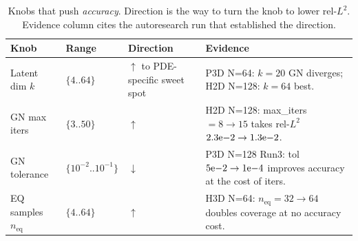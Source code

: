\documentclass{article}
\begin{document}
  \begin{table}[!htbp]                                                                                         
  \centering                                                                                               
  \caption{Knobs that push \emph{accuracy}. Direction is the way to
  turn the knob to lower rel-$L^2$. Evidence column cites the                                              
  autoresearch run that established the direction.}                                                        
  \label{tab:t2a}                                                                                          
  \small                                                                                                   
  \setlength{\tabcolsep}{4pt}                         
  \begin{tabular}{p{3.0cm}p{2.4cm}p{1.4cm}p{5.5cm}}                                                        
  \toprule                                                                                                 
  Knob & Range & Direction & Evidence \\       
  \midrule                                                                                                 
  Latent dim $k$         & $\{4..64\}$        & $\uparrow$ to PDE-specific sweet spot
    & P3D N=64: $k{=}20$ GN diverges; H2D N=128: $k{=}64$ best. \\                                         
  GN max iters           & $\{3..50\}$        & $\uparrow$                                                 
    & H2D N=128: max\_iters$=8 \to 15$ takes rel-$L^2$ $2.3{\rm e}{-2} \to 1.3{\rm e}{-2}$. \\             
  GN tolerance           & $\{10^{-2}..10^{-1}\}$ & $\downarrow$                                           
    & P3D N=128 Run3: tol $5{\rm e}{-2} \to 1{\rm e}{-4}$ improves accuracy at the cost of iters. \\       
  EQ samples $n_\mathrm{eq}$ & $\{4..64\}$    & $\uparrow$                                                 
    & H3D N=64: $n_\mathrm{eq}=32 \to 64$ doubles coverage at no accuracy cost. \\                         
  \bottomrule                                                                                              
  \end{tabular}                                                                                            
  \end{table}                                                                                              
                                                                                                           
\end{document}
